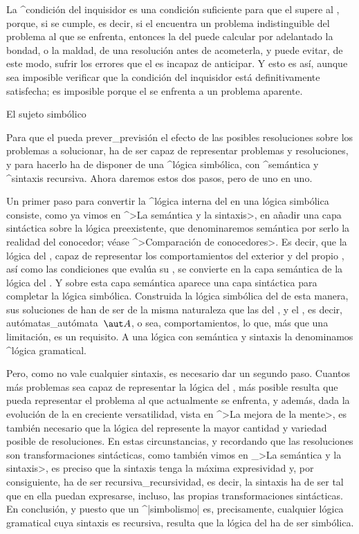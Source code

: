 \noindent La ^{condición del inquisidor} es una condición suficiente
para que el {\sujeto} supere al {\conocedor}, porque, si se cumple, es
decir, si el {\inquisidor} encuentra un problema indistinguible del
problema al que se enfrenta, entonces la {\razon} del {\sujeto} puede
calcular por adelantado la bondad, o la maldad, de una resolución antes
de acometerla, y puede evitar, de este modo, sufrir los errores que el
{\conocedor} es incapaz de anticipar. Y esto es así, aunque sea
imposible verificar que la condición del inquisidor está definitivamente
satisfecha; es imposible porque el {\sujeto} se enfrenta a un problema
aparente.


\Section El sujeto simbólico

Para que el {\sujeto} pueda prever_{previsión} el efecto de las posibles
resoluciones sobre los problemas a solucionar, ha de ser capaz de
representar problemas y resoluciones, y para hacerlo ha de disponer de
una ^{lógica simbólica}, con ^{semántica} y ^{sintaxis} recursiva. Ahora
daremos estos dos pasos, pero de uno en uno.

Un primer paso para convertir la ^{lógica interna} del {\conocedor} en
una lógica simbólica consiste, como ya vimos en ^>La semántica y la
sintaxis>, en añadir una capa sintáctica sobre la lógica preexistente,
que denominaremos semántica por serlo la realidad del conocedor; véase
^>Comparación de conocedores>. Es decir, que la lógica del {\conocedor},
capaz de representar los comportamientos del {\universo} exterior y del
propio {\conocedor}, así como las condiciones que evalúa su
{\inteligencia}, se convierte en la capa semántica de la lógica del
{\sujeto}. Y sobre esta capa semántica aparece una capa sintáctica para
completar la lógica simbólica. Construida la lógica simbólica del
{\sujeto} de esta manera, sus soluciones de han de ser de la misma
naturaleza que las del {\conocedor}, y el {\aprendiz}, es decir,
autómatas_{autómata}~$\aut A$, o sea, comportamientos, lo que, más que
una limitación, es un requisito. A una lógica con semántica y sintaxis
la denominamos ^{lógica gramatical}.

Pero, como no vale cualquier sintaxis, es necesario dar un segundo paso.
Cuantos más problemas sea capaz de representar la lógica del {\sujeto},
más posible resulta que pueda representar el problema al que actualmente
se enfrenta, y además, dada la evolución de la {\mente} en creciente
versatilidad, vista en ^>La mejora de la mente>, es también necesario
que la lógica del {\sujeto} represente la mayor cantidad y variedad
posible de resoluciones. En estas circunstancias, y recordando que las
resoluciones son transformaciones sintácticas, como también vimos en
_>La semántica y la sintaxis>, es preciso que la sintaxis tenga la
máxima expresividad y, por consiguiente, ha de ser
recursiva_{recursividad}, es decir, la sintaxis ha de ser tal que en
ella puedan expresarse, incluso, las propias transformaciones
sintácticas. En conclusión, y puesto que un ^|simbolismo| es,
precisamente, cualquier lógica gramatical cuya sintaxis es recursiva,
resulta que la lógica del {\sujeto} ha de ser simbólica.


